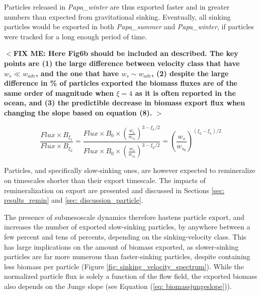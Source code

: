 \documentclass[draft,linenumbers]{agujournal2018}
\newcommand{\fixme}[1]{\color{red}$<$\textbf{FIX ME: #1}$>$\color{black}}
\begin{document}

Particles released in \textit{Papa\_winter} are thus exported faster and in greater numbers than expected from gravitational sinking. Eventually, all sinking particles would be exported in both \textit{Papa\_summer} and \textit{Papa\_winter}, if particles were tracked for a long enough period of time. 

\fixme{Here Fig6b should be included an described. The key points are (1) the large difference between velocity class that have $w_s\ll w_{adv}$, and the one that have $w_s\sim w_{adv}$, (2) despite the large difference in \% of particles exported the biomass fluxes are of the same order of magnitude when $\xi=4$ as it is often reported in the ocean, and (3) the predictible decrease in biomass export flux when changing the slope based on equation (8). }

\begin{equation}
    \frac{Flux\times B_{\xi_1}}{Flux\times B_{\xi_2}} = \frac{Flux \times B_0 \times \left(\frac{w_s}{w_s_0}\right)^{3-\xi_1/2}}{Flux \times B_0 \times \left(\frac{w_s}{w_s_0}\right)^{3-\xi_2/2}} = \left(\frac{w_s}{w_s_0}\right)^{(\xi_2-\xi_1)/2}
\end{equation}

Particles, and specifically slow-sinking ones, are however expected to remineralize on timescales shorter than their export timescale. The impacts of remineralization on export are presented and discussed in Sections \ref{sec: results_remin} and \ref{sec: discussion_particle}.

The presence of submesoscale dynamics therefore hastens particle export, and increases the number of exported slow-sinking particles, by anywhere between a few percent and tens of percents, depending on the sinking-velocity class. This has large implications on the amount of biomass exported, as slower-sinking particles are far more numerous than faster-sinking particles, despite containing less biomass per particle (Figure \ref{fig: sinking_velocity_spectrum}). While the normalized particle flux is solely a function of the flow field, the exported biomass also depends on the Junge slope (see Equation (\ref{eq: biomassjungeslope})).
\end{document}
